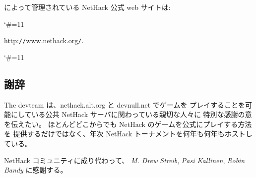 \medskip
 によって管理されている NetHack 公式 web サイトは:
{\catcode`\#=11
}
http:{\tt /}{\tt /}www.nethack.org{\tt /}.
{\catcode`\#=11
}


\subsection*{謝辞}
\nd The devteam は、nethack.alt.org と devnull.net でゲームを
プレイすることを可能にしている公共 NetHack サーバに関わっている親切な人々に
特別な感謝の意を伝えたい。
ほとんどどこからでも NetHack のゲームを公式にプレイする方法を
提供するだけではなく、年次 NetHack トーナメントを何年も何年もホストしている。

\nd NetHack コミュニティに成り代わって、
{\it M. Drew Streib}, {\it Pasi Kallinen}, {\it Robin Bandy} に感謝する。

\clearpage

